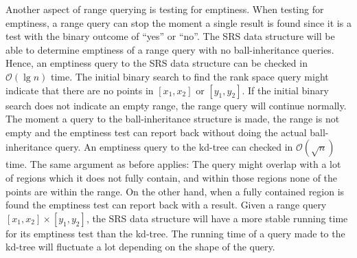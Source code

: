 
Another aspect of range querying is testing for emptiness. When testing for emptiness, a range query can stop the moment a single result is found since it is a test with the binary outcome of ``yes'' or ``no''. The SRS data structure will be able to determine emptiness of a range query with no ball-inheritance queries. Hence, an emptiness query to the SRS data structure can be checked in $\mathcal{O}(\lg n)$ time. The initial binary search to find the rank space query might indicate that there are no points in $[x_1, x_2]$ or $[y_1, y_2]$. If the initial binary search does not indicate an empty range, the range query will continue normally. The moment a query to the ball-inheritance structure is made, the range is not empty and the emptiness test can report back without doing the actual ball-inheritance query. An emptiness query to the kd-tree can checked in $\mathcal{O}(\sqrt{n})$ time. The same argument as before applies: The query might overlap with a lot of regions which it does not fully contain, and within those regions none of the points are within the range. On the other hand, when a fully contained region is found the emptiness test can report back with a result. Given a range query $[x_1, x_2] \times [y_1, y_2]$, the SRS data structure will have a more stable running time for its emptiness test than the kd-tree. The running time of a query made to the kd-tree will fluctuate a lot depending on the shape of the query.

